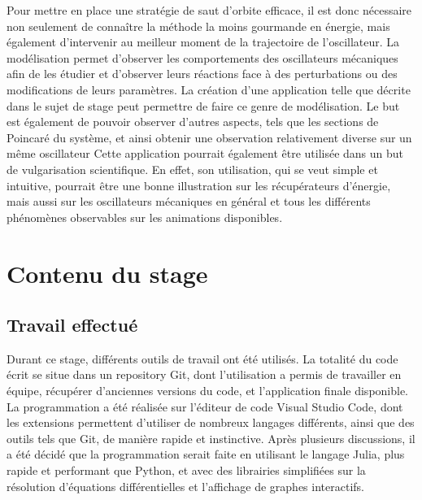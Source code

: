 \documentclass[a4paper, french, 12pt, titlepage]{article}
\begin{document}
Pour mettre en place une stratégie de saut d'orbite efficace, il est donc nécessaire non seulement de connaître la méthode la moins gourmande en énergie, mais également d'intervenir au meilleur moment de la trajectoire de l'oscillateur.
La modélisation permet d'observer les comportements des oscillateurs mécaniques afin de les étudier et d'observer leurs réactions face à des perturbations ou des modifications de leurs paramètres.
La création d'une application telle que décrite dans le sujet de stage peut permettre de faire ce genre de modélisation.
Le but est également de pouvoir observer d'autres aspects, tels que les sections de Poincaré du système, et ainsi obtenir une observation relativement diverse sur un même oscillateur
Cette application pourrait également être utilisée dans un but de vulgarisation scientifique.
En effet, son utilisation, qui se veut simple et intuitive, pourrait être une bonne illustration sur les récupérateurs d'énergie, mais aussi sur les oscillateurs mécaniques en général et tous les différents phénomènes observables sur les animations disponibles.



\newpage

\section{Contenu du stage}


\subsection{Travail effectué}


Durant ce stage, différents outils de travail ont été utilisés.
La totalité du code écrit se situe dans un repository Git, dont l'utilisation a permis de travailler en équipe, récupérer d'anciennes versions du code, et l'application finale disponible.
La programmation a été réalisée sur l'éditeur de code Visual Studio Code, dont les extensions permettent d'utiliser de nombreux langages différents, ainsi que des outils tels que Git, de manière rapide et instinctive.
Après plusieurs discussions, il a été décidé que la programmation serait faite en utilisant le langage Julia, plus rapide et performant que Python, et avec des librairies simplifiées sur la résolution d'équations différentielles et l'affichage de graphes interactifs.
\end{document}
